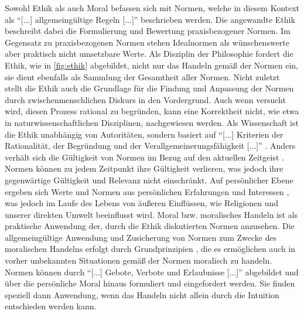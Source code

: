 Sowohl Ethik als auch Moral befassen sich mit Normen, welche in diesem Kontext als \enquote{[...] allgemeingültige Regeln [...]} \cite[S. 10 ff.]{schicha2010} beschrieben werden.
Die angewandte Ethik beschreibt dabei die Formulierung und Bewertung praxisbezogener Normen.
Im Gegensatz zu praxisbezogenen Normen stehen Idealnormen als wünschenswerte aber praktisch nicht umsetzbare Werte.
Als Disziplin der Philosophie fordert die Ethik, wie in \autoref{fig:ethik} abgebildet, nicht nur das Handeln gemäß der Normen ein, sie dient ebenfalls als Sammlung der Gesamtheit aller Normen.
Nicht zuletzt stellt die Ethik auch die Grundlage für die Findung und Anpassung der Normen durch zwischenmenschlichen Diskurs in den Vordergrund.
Auch wenn versucht wird, diesen Prozess rational zu begründen, kann eine Korrektheit nicht, wie etwa in naturwissenschaftlichen Disziplinen, nachgewiesen werden.
Als Wissenschaft ist die Ethik unabhängig von Autoritäten, sondern basiert auf \enquote{[...] Kriterien der Rationalität, der Begründung und der Verallgemeinerungsfähigkeit [...]} \cite[S. 22]{schicha2010}.
Anders verhält sich die Gültigkeit von Normen im Bezug auf den aktuellen Zeitgeist \cite[S. 10]{tannsjo2008}.
Normen können zu jedem Zeitpunkt ihre Gültigkeit verlieren, was jedoch ihre gegenwärtige Gültigkeit und Relevanz nicht einschränkt.
Auf persönlicher Ebene ergeben sich Werte und Normen aus persönlichen Erfahrungen und Interessen \cite[S. 3f]{mcnaughton1988}, was jedoch im Laufe des Lebens von äußeren Einflüssen, wie Religionen und unserer direkten Umwelt beeinflusst wird.
\ab 
Moral bzw. moralisches Handeln ist als praktische Anwendung der, durch die Ethik diskutierten Normen \cite[S. 80]{werkener2017} anzusehen.
Die allgemeingültige Anwendung und Zusicherung von Normen zum Zwecke des moralischen Handelns erfolgt durch Grundprinzipien \cite[S. 11]{schicha2010}, die es ermöglichen auch in vorher unbekannten Situationen gemäß der Normen moralisch zu handeln.
Normen können durch \enquote{[...] Gebote, Verbote und Erlaubnisse [...]} \cite[S. 80]{werkner2017} abgebildet und über die persönliche Moral hinaus formuliert und eingefordert werden.
Sie finden speziell dann Anwendung, wenn das Handeln nicht allein durch die Intuition entschieden werden kann.


